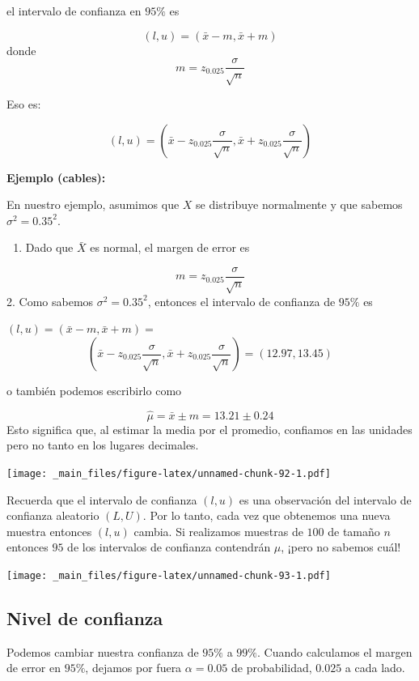 \documentclass[
]{book}
\providecommand{\tightlist}{%
  \setlength{\itemsep}{0pt}\setlength{\parskip}{0pt}}
\begin{document}
el intervalo de confianza en \(95\%\) es

\[(l,u)=(\bar{x} - m, \bar{x} + m)\]
donde \[m=z_{0.025} \frac{\sigma}{\sqrt{n}}\]

Eso es:

\[(l,u)=(\bar{x} - z_{0.025} \frac{\sigma}{\sqrt{n}}, \bar{x} + z_{0.025} \frac{\sigma}{ \sqrt{n}})\]

\textbf{Ejemplo (cables):}

En nuestro ejemplo, asumimos que \(X\) se distribuye normalmente y que sabemos \(\sigma^2=0.35^2\).

\begin{enumerate}
\def\labelenumi{\arabic{enumi}.}
\tightlist
\item
  Dado que \(\bar{X}\) es normal, el margen de error es
\end{enumerate}

\[m=z_{0.025} \frac{\sigma}{\sqrt{n}}\]
2. Como sabemos \(\sigma^2=0.35^2\), entonces el intervalo de confianza de \(95\%\) es

\((l,u)=(\bar{x} - m, \bar{x} + m)=\) \[(\bar{x}-z_{0.025} \frac{\sigma}{\sqrt{n }}, \bar{x}+z_{0.025} \frac{\sigma}{\sqrt{n}})= (12.97,13.45)\]

o también podemos escribirlo como

\[\hat{\mu}=\bar{x} \pm m = 13.21 \pm 0.24\]
Esto significa que, al estimar la media por el promedio, confiamos en las unidades pero no tanto en los lugares decimales.

\texttt{[image: \_main\_files/figure-latex/unnamed-chunk-92-1.pdf]}

Recuerda que el intervalo de confianza \((l,u)\) es una observación del intervalo de confianza aleatorio \((L,U)\). Por lo tanto, cada vez que obtenemos una nueva muestra entonces \((l,u)\) cambia. Si realizamos muestras de \(100\) de tamaño \(n\) entonces \(95%
\) de los intervalos de confianza contendrán \(\mu\), ¡pero no sabemos cuál!

\texttt{[image: \_main\_files/figure-latex/unnamed-chunk-93-1.pdf]}

\hypertarget{nivel-de-confianza}{%
\subsection{Nivel de confianza}\label{nivel-de-confianza}}

Podemos cambiar nuestra confianza de \(95\%\) a \(99\%\). Cuando calculamos el margen de error en \(95\%\), dejamos por fuera \(\alpha=0.05\) de probabilidad, \(0.025\) a cada lado.
\end{document}
